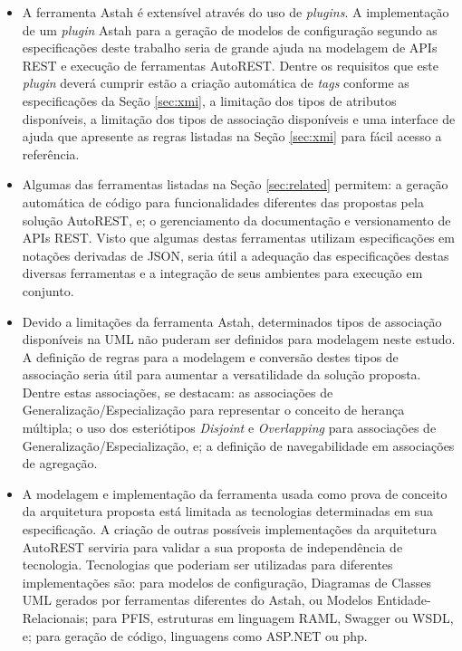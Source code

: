 \begin{itemize}
    \item A ferramenta Astah é extensível através do uso de \textit{plugins}. A implementação de um \textit{plugin} Astah para a geração de modelos de configuração segundo as especificações deste trabalho seria de grande ajuda na modelagem de APIs REST e execução de ferramentas AutoREST. Dentre os requisitos que este \textit{plugin} deverá cumprir estão a criação automática de \textit{tags} conforme as especificações da Seção \ref{sec:xmi}, a limitação dos tipos de atributos disponíveis, a limitação dos tipos de associação disponíveis e uma interface de ajuda que apresente as regras listadas na Seção \ref{sec:xmi} para fácil acesso a referência.

    \item Algumas das ferramentas listadas na Seção \ref{sec:related} permitem: a geração automática de código para funcionalidades diferentes das propostas pela solução AutoREST, e; o gerenciamento da documentação e versionamento de APIs REST. Visto que algumas destas ferramentas utilizam especificações em notações derivadas de JSON, seria útil a adequação das especificações destas diversas ferramentas e a integração de seus ambientes para execução em conjunto.

    \item Devido a limitações da ferramenta Astah, determinados tipos de associação disponíveis na UML não puderam ser definidos para modelagem neste estudo. A definição de regras para a modelagem e conversão destes tipos de associação seria útil para aumentar a versatilidade da solução proposta. Dentre estas associações, se destacam: as associações de Generalização/Especialização para representar o conceito de herança múltipla; o uso dos esteriótipos \textit{Disjoint} e \textit{Overlapping} para associações de Generalização/Especialização, e; a definição de navegabilidade em associações de agregação.

    \item A modelagem e implementação da ferramenta usada como prova de conceito da arquitetura proposta está limitada as tecnologias determinadas em sua especificação. A criação de outras possíveis implementações da arquitetura AutoREST serviria para validar a sua proposta de independência de tecnologia. Tecnologias que poderiam ser utilizadas para diferentes implementações são: para modelos de configuração, Diagramas de Classes UML gerados por ferramentas diferentes do Astah, ou Modelos Entidade-Relacionais; para PFIS, estruturas em linguagem RAML, Swagger ou WSDL, e; para geração de código, linguagens como ASP.NET ou php.
\end{itemize}
